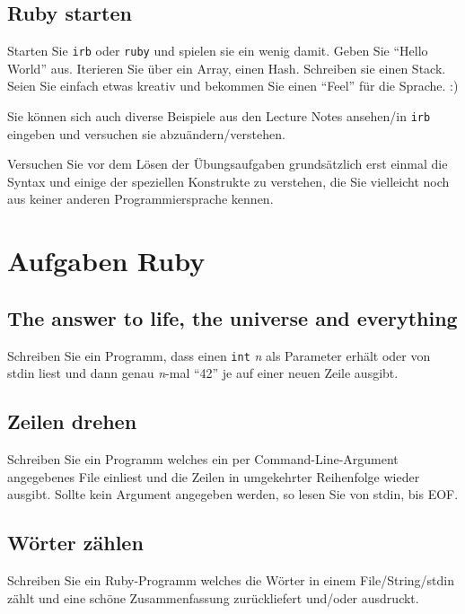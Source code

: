 \documentclass[a4paper,11pt,oneside]{scrbook}
\begin{document}
\section{Ruby starten} %
\label{sec:ruby_starten}
Starten Sie \texttt{irb} oder \texttt{ruby} und spielen sie ein wenig damit. Geben Sie “Hello World” aus. Iterieren Sie über ein Array, einen Hash. Schreiben sie einen Stack. Seien Sie einfach etwas kreativ und bekommen Sie einen “Feel” für die Sprache. :)

Sie können sich auch diverse Beispiele aus den Lecture Notes ansehen/in \texttt{irb} eingeben und versuchen sie abzuändern/verstehen.

Versuchen Sie vor dem Lösen der Übungsaufgaben grundsätzlich erst einmal die Syntax und einige der speziellen Konstrukte zu verstehen, die Sie vielleicht noch aus keiner anderen Programmiersprache kennen.








\chapter{Aufgaben Ruby} %
\label{cha:Aufgaben Ruby}


\section{The answer to life, the universe and everything} %
\label{sec:the_answer_to_life_the_universe_and_everything}
Schreiben Sie ein Programm, dass einen \texttt{int} \emph{n} als Parameter erhält oder von stdin liest und dann genau \emph{n}-mal “42” je auf einer neuen Zeile ausgibt.



\section{Zeilen drehen} %
\label{sec:Zeilen drehen}
Schreiben Sie ein Programm welches ein per Command-Line-Argument angegebenes File einliest und die Zeilen in umgekehrter Reihenfolge wieder ausgibt.
Sollte kein Argument angegeben werden, so lesen Sie von stdin, bis EOF.


\section{Wörter zählen} %
\label{sec:Wörter zählen}
Schreiben Sie ein Ruby-Programm welches die Wörter in einem File/String/stdin zählt und eine schöne Zusammenfassung zurückliefert und/oder ausdruckt.
\end{document}
